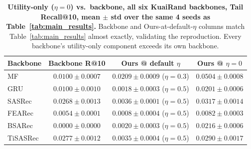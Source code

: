 \begin{table}[t]
\centering
\caption{\textbf{Utility-only ($\eta=0$) vs.\ backbone, all six KuaiRand backbones,
Tail Recall@10, mean $\pm$ std over the same 4 seeds as Table~\ref{tab:main_results}.}
Backbone and Ours-at-default-$\eta$ columns match Table~\ref{tab:main_results} almost
exactly, validating the reproduction. Every backbone's utility-only component exceeds
its own backbone.}
\label{tab:kuairand_eta0_verification}
\begin{tabular}{l ccc}
\toprule
Backbone & Backbone R@10 & Ours @ default $\eta$ & Ours @ $\eta=0$ \\
\midrule
MF & $0.0100\pm0.0007$ & $0.0209\pm0.0009$ ($\eta{=}0.3$) & $\mathbf{0.0504\pm0.0008}$ \\
GRU & $0.0100\pm0.0010$ & $0.0018\pm0.0003$ ($\eta{=}0.5$) & $\mathbf{0.0201\pm0.0006}$ \\
SASRec & $0.0268\pm0.0013$ & $0.0036\pm0.0001$ ($\eta{=}0.5$) & $\mathbf{0.0317\pm0.0014}$ \\
FEARec & $0.0054\pm0.0001$ & $0.0008\pm0.0004$ ($\eta{=}0.5$) & $\mathbf{0.0082\pm0.0003}$ \\
BSARec & $0.0000\pm0.0000$ & $0.0020\pm0.0003$ ($\eta{=}0.5$) & $\mathbf{0.0216\pm0.0006}$ \\
TiSASRec & $0.0277\pm0.0012$ & $0.0035\pm0.0004$ ($\eta{=}0.5$) & $\mathbf{0.0290\pm0.0017}$ \\
\bottomrule
\end{tabular}
\end{table}
